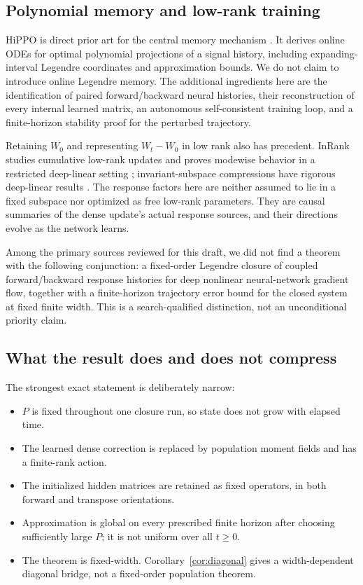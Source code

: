 \subsection{Polynomial memory and low-rank training}

HiPPO is direct prior art for the central memory mechanism
\citep{gu2020hippo}.  It derives online ODEs for optimal polynomial projections
of a signal history, including expanding-interval Legendre coordinates and
approximation bounds.  We do not claim to introduce online Legendre memory.
The additional ingredients here are the identification of paired
forward/backward neural histories, their reconstruction of every internal
learned matrix, an autonomous self-consistent training loop, and a
finite-horizon stability proof for the perturbed trajectory.

Retaining $W_0$ and representing $W_t-W_0$ in low rank also has precedent.
InRank studies cumulative low-rank updates and proves modewise behavior in a
restricted deep-linear setting \citep{zhao2024inrank}; invariant-subspace
compressions have rigorous deep-linear results
\citep{kwon2024compression,yaras2024compressible}.  The response factors here
are neither assumed to lie in a fixed subspace nor optimized as free low-rank
parameters.  They are causal summaries of the dense update's actual response
sources, and their directions evolve as the network learns.

Among the primary sources reviewed for this draft, we did not find a theorem
with the following conjunction: a fixed-order Legendre closure of coupled
forward/backward response histories for deep nonlinear neural-network gradient
flow, together with a finite-horizon trajectory error bound for the closed
system at fixed finite width.  This is a search-qualified distinction, not an
unconditional priority claim.

\subsection{What the result does and does not compress}

The strongest exact statement is deliberately narrow:
\begin{itemize}[leftmargin=*]
\item $P$ is fixed throughout one closure run, so state does not grow with
      elapsed time.
\item The learned dense correction is replaced by population moment fields and
      has a finite-rank action.
\item The initialized hidden matrices are retained as fixed operators, in both
      forward and transpose orientations.
\item Approximation is global on every prescribed finite horizon after choosing
      sufficiently large $P$; it is not uniform over all $t\ge0$.
\item The theorem is fixed-width.  Corollary~\ref{cor:diagonal} gives a
      width-dependent diagonal bridge, not a fixed-order population theorem.
\end{itemize}

